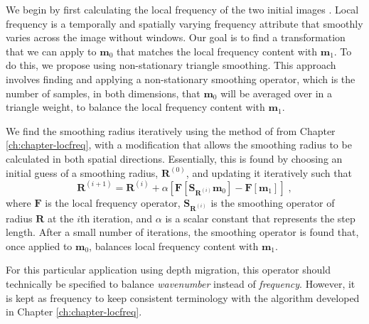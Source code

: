     We begin by first calculating the local frequency of the two initial images \cite[]{attr}. 
    Local frequency is a temporally and spatially varying frequency attribute that smoothly varies across the image without windows.
    Our goal is to find a transformation that we can apply to $\mathbf{m}_0$ that matches the local frequency content with $\mathbf{m}_1$. 
    To do this, we propose using non-stationary triangle smoothing. 
    This approach involves finding and applying a non-stationary smoothing operator, which is the number of samples, in both dimensions, that $\mathbf{m}_0$ will be averaged over in a triangle weight, to balance the local frequency content with $\mathbf{m}_1$. 
    
    We find the smoothing radius iteratively using the method of \cite{locfreq} from Chapter \ref{ch:chapter-locfreq}, with a modification that allows the smoothing radius to be calculated in both spatial directions. 
Essentially, this is found by choosing an initial guess of a smoothing radius, $\mathbf{R}^{(0)}$, and updating it iteratively such that 
    \begin{equation}
        \label{eq:it}
        \mathbf{R}^{(i+1)} = \mathbf{R}^{(i)}+ \alpha \left [ \mathbf{F}[\mathbf{S}_{\mathbf{R}^{(i)}} \mathbf{m}_0] - \mathbf{F}[\mathbf{m}_1] \right ]\;,
    \end{equation}
    where $\mathbf{F}$ is the local frequency operator, $\mathbf{S}_{\mathbf{R}^{(i)}}$ is the smoothing operator of radius $\mathbf{R}$ at the $i$th iteration, and $\alpha$ is a scalar constant that represents the step length.
    After a small number of iterations, the smoothing operator is found that, once applied to $\mathbf{m}_0$, balances local frequency content with $\mathbf{m}_1$.

    For this particular application using depth migration, this operator should technically be specified to balance {\em wavenumber} instead of {\em frequency}.
    However, it is kept as frequency to keep consistent terminology with the algorithm developed in Chapter \ref{ch:chapter-locfreq}.



